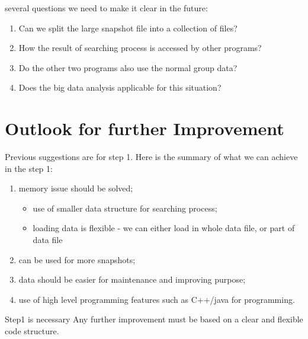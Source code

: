 \documentclass[notheorems, aspectratio=54]{beamer}
\begin{document}
\begin{frame}[fragile]

\begin{block}{several questions we need to make it clear in the future:}
 \begin{enumerate}
  \item Can we split the large snapshot file into a collection of files?
  \item How the result of searching process is accessed by other programs?
  \item Do the other two programs also use the normal group data?
  \item Does the big data analysis applicable for this situation?
 \end{enumerate}
\end{block}

\end{frame}

\section{Outlook for further Improvement}
\begin{frame}[fragile]

Previous suggestions are for step 1. Here is the summary of what we can achieve in the 
step 1:
 \begin{enumerate}
  \item memory issue should be solved;
  \begin{itemize}
   \item use of smaller data structure for searching process;
   \item loading data is flexible - we can either load in whole data file, or part of 
   data file
  \end{itemize}
  \item can be used for more snapshots; 
  \item data should be easier for maintenance and improving purpose;
  \item use of high level programming features such as C++/java for programming.
 \end{enumerate}
 
 \begin{alertblock}{Step1 is necessary}
  Any further improvement must be based on a clear and flexible code structure.
 \end{alertblock}


\end{frame}
\end{document}
